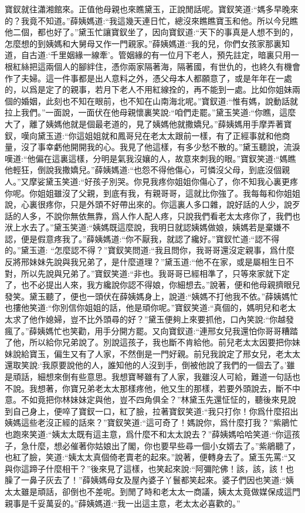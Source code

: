 \begin{parag}
    寶釵就往瀟湘館來。正值他母親也來瞧黛玉，正說閒話呢。寶釵笑道:“媽多早晚來的？我竟不知道。”薛姨媽道:“我這幾天連日忙，總沒來瞧瞧寶玉和他。所以今兒瞧他二個，都也好了。”黛玉忙讓寶釵坐了，因向寶釵道:“天下的事真是人想不到的，怎麼想的到姨媽和大舅母又作一門親家。”薛姨媽道:“我的兒，你們女孩家那裏知道，自古道:‘千里姻緣一線牽’。管姻緣的有一位月下老人，預先註定，暗裏只用一根紅絲把這兩個人的腳絆住，憑你兩家隔著海，隔著國，有世仇的，也終久有機會作了夫婦。這一件事都是出人意料之外，憑父母本人都願意了，或是年年在一處的，以爲是定了的親事，若月下老人不用紅線拴的，再不能到一處。比如你姐妹兩個的婚姻，此刻也不知在眼前，也不知在山南海北呢。”寶釵道:“惟有媽，說動話就拉上我們。”一面說，一面伏在他母親懷裏笑說:“咱們走罷。”黛玉笑道:“你瞧，這麼大了，離了姨媽他就是個最老道的，見了姨媽他就撒嬌兒。”薛姨媽用手摩弄著寶釵，嘆向黛玉道:“你這姐姐就和鳳哥兒在老太太跟前一樣，有了正經事就和他商量，沒了事幸虧他開開我的心。我見了他這樣，有多少愁不散的。”黛玉聽說，流淚嘆道:“他偏在這裏這樣，分明是氣我沒孃的人，故意來刺我的眼。”寶釵笑道:“媽瞧他輕狂，倒說我撒嬌兒。”薛姨媽道:“也怨不得他傷心，可憐沒父母，到底沒個親人。”又摩娑黛玉笑道:“好孩子別哭。你見我疼你姐姐你傷心了，你不知我心裏更疼你呢。你姐姐雖沒了父親，到底有我，有親哥哥，這就比你強了。我每每和你姐姐說，心裏很疼你，只是外頭不好帶出來的。你這裏人多口雜，說好話的人少，說歹話的人多，不說你無依無靠，爲人作人配人疼，只說我們看老太太疼你了，我們也洑上水去了。”黛玉笑道:“姨媽既這麼說，我明日就認姨媽做娘，姨媽若是棄嫌不認，便是假意疼我了。”薛姨媽道:“你不厭我，就認了纔好。”寶釵忙道:“認不得的。”黛玉道: “怎麼認不得？”寶釵笑問道:“我且問你，我哥哥還沒定親事，爲什麼反將邢妹妹先說與我兄弟了，是什麼道理？”黛玉道:“他不在家，或是屬相生日不對，所以先說與兄弟了。”寶釵笑道:“非也。我哥哥已經相準了，只等來家就下定了，也不必提出人來，我方纔說你認不得娘，你細想去。”說著，便和他母親擠眼兒發笑。黛玉聽了，便也一頭伏在薛姨媽身上，說道:“姨媽不打他我不依。”薛姨媽忙也摟他笑道:“你別信你姐姐的話，他是頑你呢。”寶釵笑道:“真個的，媽明兒和老太太求了他作媳婦，豈不比外頭尋的好？”黛玉便夠上來要抓他，口內笑說:“你越發瘋了。”薛姨媽忙也笑勸，用手分開方罷。又向寶釵道:“連邢女兒我還怕你哥哥糟踏了他，所以給你兄弟說了。別說這孩子，我也斷不肯給他。前兒老太太因要把你妹妹說給寶玉，偏生又有了人家，不然倒是一門好親。前兒我說定了邢女兒，老太太還取笑說:‘我原要說他的人，誰知他的人沒到手，倒被他說了我們的一個去了。’雖是頑話，細想來倒有些意思。我想寶琴雖有了人家，我雖沒人可給，難道一句話也不說。我想著，你寶兄弟老太太那樣疼他，他又生的那樣，若要外頭說去，斷不中意。不如竟把你林妹妹定與他，豈不四角俱全？”林黛玉先還怔怔的，聽後來見說到自己身上，便啐了寶釵一口，紅了臉，拉著寶釵笑道:“我只打你！你爲什麼招出姨媽這些老沒正經的話來？”寶釵笑道:“這可奇了！媽說你，爲什麼打我？”紫鵑忙也跑來笑道:“姨太太既有這主意，爲什麼不和太太說去？”薛姨媽哈哈笑道:“你這孩子，急什麼，想必催著你姑娘出了閣，你也要早些尋一個小女婿去了。”紫鵑聽了，也紅了臉，笑道:“姨太太真個倚老賣老的起來。”說著，便轉身去了。黛玉先罵:“又與你這蹄子什麼相干？”後來見了這樣，也笑起來說:“阿彌陀佛！該，該，該！也臊了一鼻子灰去了！”薛姨媽母女及屋內婆子丫鬟都笑起來。婆子們因也笑道:“姨太太雖是頑話，卻倒也不差呢。到閒了時和老太太一商議，姨太太竟做媒保成這門親事是千妥萬妥的。”薛姨媽道:“我一出這主意，老太太必喜歡的。”
\end{parag}


